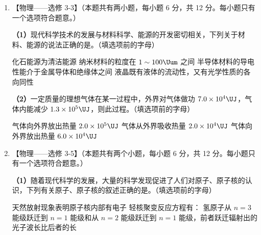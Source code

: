 \documentclass[\gkver]{gaokaozhenti}
\begin{document}
\begin{enumerate}
\item
【物理——选修 3-3】（本题共有两小题，每小题 6 分，共 12 分。每小题只有一个选项符合题意。）

\textbf{（1）}现代科学技术的发展与材料科学、能源的开发密切相关，下列关于材料、能源的说法正确的是。（填选项前的字母）

\fourchoices
{化石能源为清洁能源}
{纳米材料的粒度在 $1\sim100\Uum$ 之间}
{半导体材料的导电性能介于金属导体和绝缘体之间}
{液晶既有液体的流动性，又有光学性质的各向同性}

\textbf{（2）}一定质量的理想气体在某一过程中，外界对气体做功 $7.0\times10^{4}\UJ$，气体内能减少 $1.3\times10^{5}\UJ$，则此过程。（填选项前的字母）

{气体向外界放出热量 $2.0\times10^{5}\UJ$}
{气体从外界吸收热量 $2.0\times10^{4}\UJ$}
{气体向外界放出热量 $6.0\times10^{4}\UJ$}


\item
【物理——选修 3-5】（本题共有两个小题，每小题 6 分，共 12 分。每小题只有一个选项符合题意。）

\textbf{（1）}随着现代科学的发展，大量的科学发现促进了人们对原子、原子核的认识，下列有关原子、原子核的叙述正确的是。（填选项前的字母）

{天然放射现象表明原子核内部有电子}
{轻核聚变反应方程有：}
{氢原子从 $n=3$ 能级跃迁到 $n=1$ 能级和从 $n=2$ 能级跃迁到 $n=1$ 能级，前者跃迁辐射出的光子波长比后者的长}


\end{enumerate}
\end{document}
